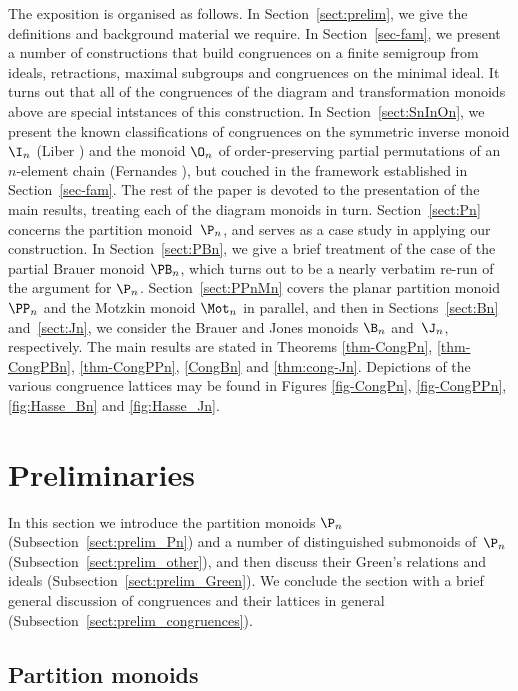 The exposition is organised as follows.  In Section~\ref{sect:prelim}, we give
the definitions and background material we require.
%
In Section~\ref{sec-fam}, we present a number of constructions that build congruences on a finite semigroup from ideals, retractions, maximal subgroups and congruences on the minimal ideal.  It turns out that all of the congruences of the diagram and transformation monoids above are special intstances of this construction.
%
In
Section~\ref{sect:SnInOn}, we present the known classifications of congruences
on the symmetric inverse monoid $\I_n$ (Liber \cite{Liber1953}) and the monoid
$\O_n$ of order-preserving partial permutations of an $n$-element chain (Fernandes
\cite{Fernandes2001}), but couched in the framework established in
Section~\ref{sec-fam}.  The rest of the paper is devoted to the
presentation of the main results, treating each of the diagram monoids in turn.
Section~\ref{sect:Pn} concerns the partition monoid~$\P_n$, and serves as
a case study in applying our construction.  In Section~\ref{sect:PBn}, we give a brief treatment of the case of the partial
Brauer monoid $\PB_n$, which turns out to be a nearly verbatim re-run of the
argument for $\P_n$.  Section~\ref{sect:PPnMn} covers the planar partition
monoid $\PP_n$ and the Motzkin monoid $\Mot_n$ in parallel, and then in
Sections~\ref{sect:Bn} and~\ref{sect:Jn}, we consider the Brauer and Jones
monoids $\B_n$ and~$\J_n$, respectively.
%
The main results are stated in Theorems \ref{thm-CongPn}, \ref{thm-CongPBn}, \ref{thm-CongPPn}, \ref{CongBn} and \ref{thm:cong-Jn}.  Depictions of the various congruence lattices may be found in Figures \ref{fig-CongPn}, \ref{fig-CongPPn}, \ref{fig:Hasse_Bn} and \ref{fig:Hasse_Jn}.

\section{Preliminaries}\label{sec:prelim}

In this section we introduce the partition monoids $\P_n$
(Subsection~\ref{sect:prelim_Pn}) and a number of distinguished submonoids
of~$\P_n$ (Subsection~\ref{sect:prelim_other}), and then discuss their Green's
relations and ideals (Subsection~\ref{sect:prelim_Green}).  We conclude the
section with a brief general discussion of congruences and their lattices in
general (Subsection~\ref{sect:prelim_congruences}).

\subsection{Partition monoids}\label{sec:prelim_Pn}

